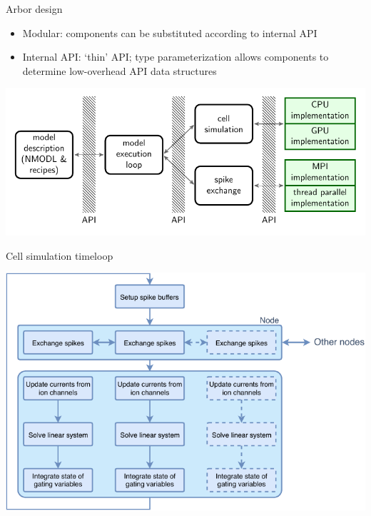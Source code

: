 \documentclass[t,aspectratio=1610]{beamer}
\begin{document}
{

}


\begin{frame}{Arbor design}
    \begin{itemize}
    \item Modular: components can be substituted according to internal API
    \item Internal API: `thin' API; type parameterization allows components to determine low-overhead API data structures
    \end{itemize}
    \begin{center}
      \includegraphics[width=.9\textwidth]{api.pdf}
    \end{center}
\end{frame}





\begin{frame}{Cell simulation timeloop}
\begin{center}
    \includegraphics[height=.75\textheight]{timeloop.pdf}
\end{center}
\end{frame}
\end{document}
